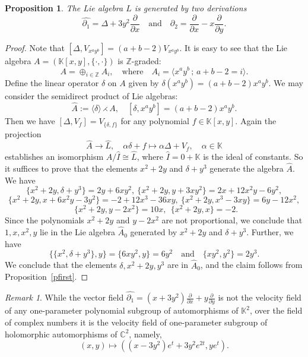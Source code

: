 \documentclass[a4paper,draft,reqno,12pt]{amsart}
\newtheorem{proposition}[theorem]{Proposition}
\theoremstyle{definition}
\theoremstyle{remark}
\newtheorem {remark}[theorem]{Remark}
\def\CC{{\mathbb C}}
\def\KK{{\mathbb K}}
\def\ZZ{{\mathbb Z}}
\begin{document}
\begin{proposition} \label{psecond}
The Lie algebra $\widehat{L}$ is generated by two derivations 
$$
\widehat{\partial_1}= \Delta + 3y^2\frac{\partial}{\partial x} \quad \text{and} \quad \partial_2= \frac{\partial}{\partial x}-x\frac{\partial}{\partial y}.
$$
\end{proposition}

\begin{proof}
Note that $[\Delta, V_{x^ay^b}]=(a+b-2)V_{x^ay^b}$.  It is easy to see that the Lie algebra $A=(\KK[x,y], \{\cdot, \cdot\})$ is
$\ZZ$-graded:
$$
A=\oplus_{i\in\ZZ} A_i, \quad \text{where} \quad  A_i=\langle x^ay^b \, ;  \, a+b-2=i\rangle. 
$$
Define the linear operator $\delta$ on $A$ given by $\delta(x^ay^b)=(a+b-2)x^ay^b$. We may consider the semidirect product
of Lie algebras:
$$
\widehat{A}:=\langle \delta\rangle \rightthreetimes A, \quad [\delta, x^ay^b]=(a+b-2)x^ay^b. 
$$
Then we have $[\Delta, V_f]=V_{\{\delta,f\}}$ for any polynomial $f\in\KK[x,y]$. Again the projection 
$$
\widehat{A}\to\widehat{L}, \quad \alpha\delta+f\mapsto \alpha\Delta+V_f, \quad \alpha\in\KK
$$
establishes an isomorphism $\widehat{A}/\widehat{I}\cong\widehat{L}$, where $\widehat{I}=0+\KK$ is the ideal of constants. So it suffices to prove that the elements $x^2+2y$ and $\delta+y^3$ generate the algebra
$\widehat{A}$. We have 
$$
\{x^2+2y,\delta+y^3\}=2y+6xy^2, \ \{x^2+2y, y+3xy^2\}=2x+12x^2y-6y^2, 
$$
$$
\{x^2+2y, x+ 6x^2y - 3y^2\}=-2+12x^3-36xy, \  \{x^2+2y, x^3-3xy\}=6y-12x^2, 
$$
$$
\ \ \{x^2+2y, y-2x^2\}=10x, \ \ \{x^2+2y, x\}=-2.
$$
Since the polynomials $x^2+2y$ and $y-2x^2$ are not proportional, we conclude 
that $1,x,x^2,y$ lie in the Lie algebra $\widehat{A}_0$ generated by $x^2+2y$ and $\delta+y^3$. Further, we have
$$
\{\{x^2,\delta+y^3\},y\}=\{6xy^2,y\}=6y^2 \quad \text{and} \quad \{xy^2,y^2\}=2y^3.
$$
We conclude that the elements $\delta, x^2+2y, y^3$ are in $\widehat{A}_0$, and the claim follows from Proposition~\ref{pfirst}. 
\end{proof}

\begin{remark}
While the vector field $\widehat{\partial_1}=(x+3y^2)\frac{\partial}{\partial x}+y\frac{\partial}{\partial y}$  is not the velocity field of any one-parameter polynomial subgroup of automorphisms of $\KK^2$, over the field of complex numbers it is the velocity field of one-parameter subgroup of holomorphic automorphisms of $\CC^2$,
namely,
$$
(x,y)\mapsto ((x-3y^2) e^t+3y^2 e^{2t}, y e^{t}). 
$$
\end{remark}
\end{document}
